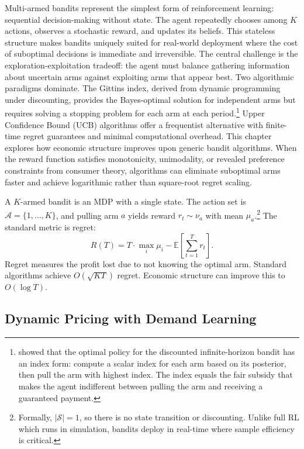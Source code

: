 Multi-armed bandits represent the simplest form of reinforcement learning: sequential decision-making without state. The agent repeatedly chooses among $K$ actions, observes a stochastic reward, and updates its beliefs. This stateless structure makes bandits uniquely suited for real-world deployment where the cost of suboptimal decisions is immediate and irreversible. The central challenge is the exploration-exploitation tradeoff: the agent must balance gathering information about uncertain arms against exploiting arms that appear best. Two algorithmic paradigms dominate. The Gittins index, derived from dynamic programming under discounting, provides the Bayes-optimal solution for independent arms but requires solving a stopping problem for each arm at each period.\footnote{\citet{Gittins1979} showed that the optimal policy for the discounted infinite-horizon bandit has an index form: compute a scalar index for each arm based on its posterior, then pull the arm with highest index. The index equals the fair subsidy that makes the agent indifferent between pulling the arm and receiving a guaranteed payment.} Upper Confidence Bound (UCB) algorithms offer a frequentist alternative with finite-time regret guarantees and minimal computational overhead. This chapter explores how economic structure improves upon generic bandit algorithms. When the reward function satisfies monotonicity, unimodality, or revealed preference constraints from consumer theory, algorithms can eliminate suboptimal arms faster and achieve logarithmic rather than square-root regret scaling.

A $K$-armed bandit is an MDP with a single state. The action set is $\mathcal{A} = \{1, \ldots, K\}$, and pulling arm $a$ yields reward $r_t \sim \nu_{a}$ with mean $\mu_{a}$.\footnote{Formally, $|\mathcal{S}| = 1$, so there is no state transition or discounting. Unlike full RL which runs in simulation, bandits deploy in real-time where sample efficiency is critical.} The standard metric is regret:
\[
R(T) = T \cdot \max_i \mu_i - \mathbb{E}\left[\sum_{t=1}^T r_t\right].
\]
Regret measures the profit lost due to not knowing the optimal arm. Standard algorithms achieve $O(\sqrt{KT})$ regret. Economic structure can improve this to $O(\log T)$.

\subsection{Dynamic Pricing with Demand Learning}

